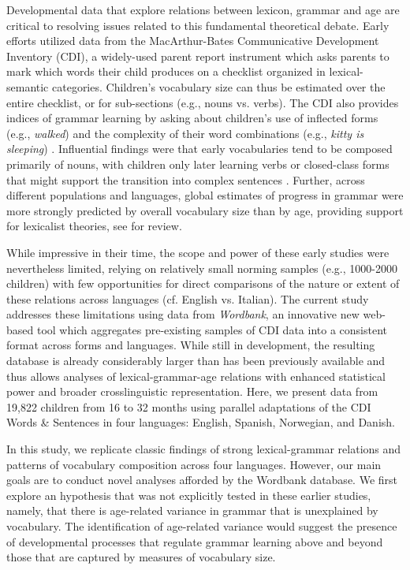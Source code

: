 \documentclass[10pt,letterpaper]{article}
\begin{document}
Developmental data that explore relations between lexicon, grammar and age are critical to resolving issues related to this fundamental theoretical debate.  Early efforts utilized data from the MacArthur-Bates Communicative Development Inventory (CDI), a widely-used parent report instrument which asks parents to mark which words their child produces on a checklist organized in lexical-semantic categories. Children's vocabulary size can thus be estimated over the entire checklist, or for sub-sections (e.g., nouns vs. verbs). The CDI also provides indices of grammar learning by asking about children's use of inflected forms (e.g., \emph{walked}) and the complexity of their word combinations (e.g., \emph{kitty is sleeping}) \cite{bates1997,caselli1999}.  Influential findings were that early vocabularies tend to be composed primarily of nouns, with children only later learning verbs or closed-class forms that might support the transition into complex sentences \cite{bates1994}. Further, across different populations and languages, global estimates of progress in grammar were more strongly predicted by overall vocabulary size than by age, providing support for lexicalist theories, see \cite{bates1999} for review. 


While impressive in their time, the scope and power of these early studies were nevertheless limited, relying on relatively small norming samples (e.g., 1000-2000 children) with few opportunities for direct comparisons of the nature or extent of these relations across languages (cf. English vs. Italian). The current study addresses these limitations using data from \emph{Wordbank}, an innovative new web-based tool which aggregates pre-existing samples of CDI data into a consistent format across forms and languages. While still in development, the resulting database is already considerably larger than has been previously available and thus allows analyses of lexical-grammar-age relations with enhanced statistical power and broader crosslinguistic representation. Here, we present data from 19,822 children from 16 to 32 months using parallel adaptations of the CDI Words \& Sentences in four languages: English, Spanish, Norwegian, and Danish.


In this study, we replicate classic findings of strong lexical-grammar relations and patterns of vocabulary composition across four languages. However, our main goals are to conduct novel analyses afforded by the Wordbank database. We first explore an hypothesis that was not explicitly tested in these earlier studies, namely, that there is age-related variance in grammar that is unexplained by vocabulary. The identification of age-related variance would suggest the presence of developmental processes that regulate grammar learning above and beyond those that are captured by measures of vocabulary size.
\end{document}
